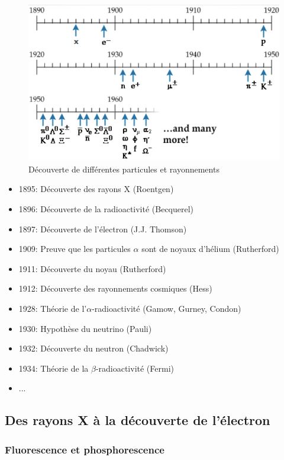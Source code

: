 \begin{figure}[ht]
    \centering
    \includegraphics[scale=0.50]{Images1/ldt.png}
    \caption{Découverte de différentes particules et rayonnements}
    \label{fig:decouvertes}
\end{figure}

\begin{itemize}
    \item 1895: Découverte des rayons X (Roentgen)
    \item 1896: Découverte de la radioactivité (Becquerel)
    \item 1897: Découverte de l'électron (J.J. Thomson)
    \item 1909: Preuve que les particules $\alpha$ sont de noyaux d'hélium (Rutherford)
    \item 1911: Découverte du noyau (Rutherford)
    \item 1912: Découverte des rayonnements cosmiques (Hess)
    \item 1928: Théorie de l'$\alpha$-radioactivité (Gamow, Gurney, Condon)
    \item 1930: Hypothèse du neutrino (Pauli)
    \item 1932: Découverte du neutron (Chadwick)
    \item 1934: Théorie de la $\beta$-radioactivité (Fermi)
    \item ... 
\end{itemize}


\subsection{Des rayons X à la découverte de l'électron}
\subsubsection{Fluorescence et phosphorescence}

